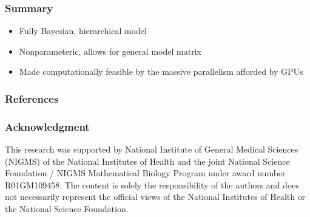 \documentclass[handout]{beamer}
\begin{document}
\begin{frame}
\frametitle{Summary}
  \begin{itemize}
    \item Fully Bayesian, hierarchical model
    \item Nonparameteric, allows for general model matrix
    \item Made computationally feasible by the massive parallelism afforded by GPUs
  \end{itemize}
\end{frame}

\begin{frame}[allowframebreaks]
  \tiny
  \frametitle{References}
  
  
\end{frame}

\begin{frame}%
  \frametitle{Acknowledgment}
  \small%
  This research was supported by National Institute of General Medical Sciences (NIGMS) of the National Institutes of Health and the joint National Science Foundation / NIGMS Mathematical Biology Program under award number R01GM109458. The content is solely the responsibility of the authors and does not necessarily represent the official views of the National Institutes of Health or the National Science Foundation.
\end{frame}
\end{document}
